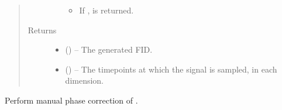 \documentclass[letterpaper,10pt,english]{sphinxmanual}
\begin{document}
\begin{fulllineitems}
\begin{fulllineitems}
\begin{quote}
\begin{description}
\begin{itemize}
\begin{itemize}
\item {} 
\sphinxAtStartPar
If ,  is returned.

\end{itemize}


\end{itemize}

\item[{Returns}] \leavevmode
\sphinxAtStartPar
\begin{itemize}
\item {} 
\sphinxAtStartPar
{} () – The generated FID.

\item {} 
\sphinxAtStartPar
{} () – The time\sphinxhyphen{}points at which the signal is sampled, in each dimension.

\end{itemize}


\end{description}\end{quote}


\nopagebreak


\sphinxAtStartPar
{\hyperref[\detokenize{references/sig:nmrespy.sig.make_fid}]{}}



\end{fulllineitems}


\begin{fulllineitems}
\label{\detokenize{references/core:nmrespy.core.Estimator.manual_phase_data}}
\sphinxAtStartPar
Perform manual phase correction of .


\end{fulllineitems}
\end{fulllineitems}
\end{document}

